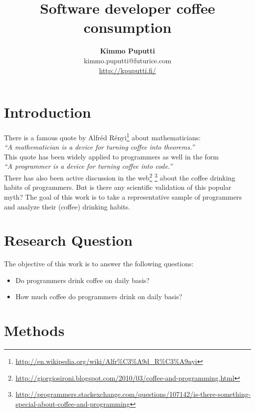 \documentclass[a4paper,12pt]{article}
\title{Software developer coffee consumption}
\author{\textbf{Kimmo Puputti}\\kimmo.puputti@futurice.com\\\url{http://kpuputti.fi/}}
\begin{document}
\maketitle
\clearpage

\section{Introduction}

There is a famous quote by Alfréd
Rényi\footnote{\url{http://en.wikipedia.org/wiki/Alfr\%C3\%A9d_R\%C3\%A9nyi}}
about mathematicians:\\

\textit{``A mathematician is a device for turning coffee into theorems.''}\\

\noindent This quote has been widely applied to programmers as well in
the form\\

\textit{``A programmer is a device for turning coffee into code.''}\\

\noindent There has also been active discussion in the
web\footnote{\url{http://giorgiosironi.blogspot.com/2010/03/coffee-and-programming.html}} \footnote{\url{http://programmers.stackexchange.com/questions/107142/is-there-something-special-about-coffee-and-programming}}
about the coffee drinking habits of programmers. But is there any
scientific validation of this popular myth? The goal of this work is
to take a representative sample of programmers and analyze their
(coffee) drinking habits.

\section{Research Question}
\label{rq}

The objective of this work is to answer the following questions:

\begin{itemize}
\item Do programmers drink coffee on daily basis?
\item How much coffee do programmers drink on daily basis?
\end{itemize}

\section{Methods}
\end{document}
